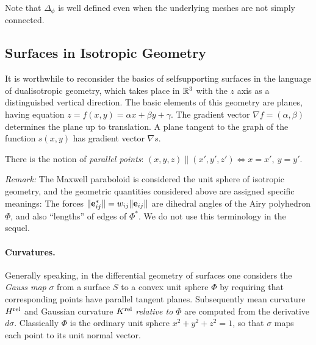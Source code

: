 \documentclass[annual]{acmsiggraph}
\def\rel{{\mathord{{\rm rel}}}}
\begin{document}
Note that $\Delta_\phi$ is well defined even when the underlying meshes
are not simply connected.

\subsection{Surfaces in Isotropic Geometry} \label{sec:smooth}

It is worthwhile to reconsider the basics of self\dash supporting surfaces
in the language of dual\dash isotropic geometry, which takes place in
${\mathbb R}^3$ with the $z$ axis as a distinguished vertical direction. The basic
elements of this geometry are planes, having equation $z=f(x,y) = \alpha
x+\beta y+\gamma$. The gradient vector $\nabla f = (\alpha,\beta)$
determines the plane up to translation. A plane tangent to the graph of
the function $s(x,y)$ has gradient vector $\nabla s$.

There is the notion of {\em parallel points}:
	$
	(x,y,z) \parallel (x',y',z') \iff
	x=x',\ y=y'
	.$

{\it Remark:} The Maxwell paraboloid is considered the unit sphere of isotropic
geometry, and the geometric quantities considered above are assigned
specific meanings: The forces $\|{\mathbf e}_{ij}^*\|=w_{ij}\|{\mathbf e}_{ij}\|$
are dihedral angles of the Airy polyhedron $\Phi$, and also ``lengths'' of
edges of $\Phi^*$. We do not use this terminology in the sequel.

\paragraph{Curvatures.}

Generally speaking, in the differential geometry of surfaces one considers
the {\em Gauss map} $\sigma$ from a surface $S$ to a convex unit sphere
$\Phi$ by requiring that corresponding points have parallel tangent
planes.  Subsequently mean curvature $H^\rel$ and Gaussian curvature
$K^\rel$ {\em relative to $\Phi$} are computed from the derivative
$d\sigma$. Classically $\Phi$ is the ordinary unit sphere $x^2+y^2+z^2=1$,
so that $\sigma$ maps each point to its unit normal vector.
\end{document}
